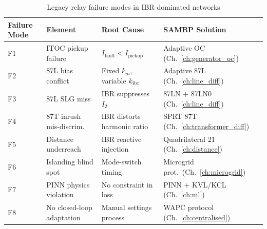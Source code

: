\begin{table}[htbp]
\caption{Legacy relay failure modes in IBR-dominated networks}
\label{tab:ch3_failures}
\small
\begin{tabularx}{\textwidth}{@{}lp{3cm}p{3.5cm}X@{}}
\toprule
Failure Mode & Element & Root Cause & SAMBP Solution \\
\midrule
F1 & ITOC pickup failure & $I_\mathrm{fault} < I_\mathrm{pickup}$ & Adaptive OC (Ch.~\ref{ch:generator_oc}) \\
F2 & 87L bias conflict & Fixed $k_m$, variable $k_\mathrm{ibr}$ & Adaptive 87L (Ch.~\ref{ch:line_diff}) \\
F3 & 87L SLG miss & IBR suppresses $I_2$ & 87LN + 87LN0 (Ch.~\ref{ch:line_diff}) \\
F4 & 87T inrush mis-discrim. & IBR distorts harmonic ratio & SPRT 87T (Ch.~\ref{ch:transformer_diff}) \\
F5 & Distance underreach & IBR reactive injection & Quadrilateral 21 (Ch.~\ref{ch:distance}) \\
F6 & Islanding blind spot & Mode-switch timing & Microgrid prot.\ (Ch.~\ref{ch:microgrid}) \\
F7 & PINN physics violation & No constraint in loss & PINN + KVL/KCL (Ch.~\ref{ch:ml}) \\
F8 & No closed-loop adaptation & Manual settings process & WAPC protocol (Ch.~\ref{ch:centralised}) \\
\bottomrule
\end{tabularx}
\end{table}
